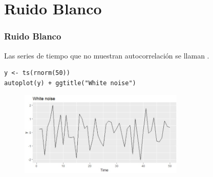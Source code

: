 \documentclass[10pt]{beamer}
\begin{document}

\section{Ruido Blanco}
\begin{frame}[fragile]
\frametitle{Ruido Blanco}

Las series de tiempo que no muestran autocorrelación se llaman .




\lstset{language=r,label= ,caption= ,captionpos=b,numbers=none}
\begin{lstlisting}
y <- ts(rnorm(50))
autoplot(y) + ggtitle("White noise")
\end{lstlisting}

\pause

\begin{figure}
\begin{center}
    \includegraphics[width=0.7\textwidth]{Imagen32.JPG}
\end{center}
\end{figure}


\end{frame}


\end{document}
